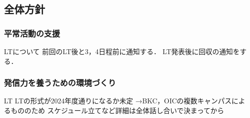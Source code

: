 \subsection*{全体方針}


\subsubsection*{平常活動の支援}
LTについて
 前回のLT後と3，4日程前に通知する．
 LT発表後に回収の通知をする．

\subsubsection*{発信力を養うための環境づくり}
LT
 LTの形式が2024年度通りになるか未定
  →BKC，OICの複数キャンパスによるもののため
 スケジュール立てなど詳細は全体話し合いで決まってから
